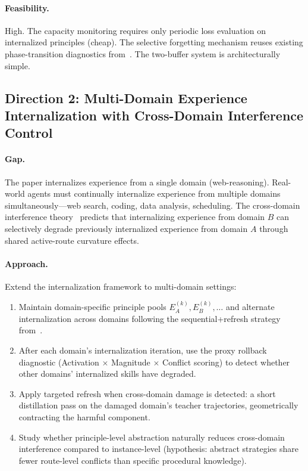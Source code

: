 \documentclass[11pt,a4paper]{article}
\begin{document}
\paragraph{Feasibility.} High. The capacity monitoring requires only periodic loss evaluation on internalized principles (cheap). The selective forgetting mechanism reuses existing phase-transition diagnostics from~\cite{xu2026lora}. The two-buffer system is architecturally simple.

\subsection{Direction 2: Multi-Domain Experience Internalization with Cross-Domain Interference Control}

\paragraph{Gap.} The paper internalizes experience from a single domain (web-reasoning). Real-world agents must continually internalize experience from multiple domains simultaneously---web search, coding, data analysis, scheduling. The cross-domain interference theory~\cite{yang2026perturbation} predicts that internalizing experience from domain $B$ can selectively degrade previously internalized experience from domain $A$ through shared active-route curvature effects.

\paragraph{Approach.} Extend the internalization framework to multi-domain settings:
\begin{enumerate}
\item Maintain domain-specific principle pools $E_A^{(k)}, E_B^{(k)}, \ldots$ and alternate internalization across domains following the sequential+refresh strategy from~\cite{yang2026perturbation}.
\item After each domain's internalization iteration, use the proxy rollback diagnostic (Activation $\times$ Magnitude $\times$ Conflict scoring) to detect whether other domains' internalized skills have degraded.
\item Apply targeted refresh when cross-domain damage is detected: a short distillation pass on the damaged domain's teacher trajectories, geometrically contracting the harmful component.
\item Study whether principle-level abstraction naturally reduces cross-domain interference compared to instance-level (hypothesis: abstract strategies share fewer route-level conflicts than specific procedural knowledge).
\end{enumerate}
\end{document}
